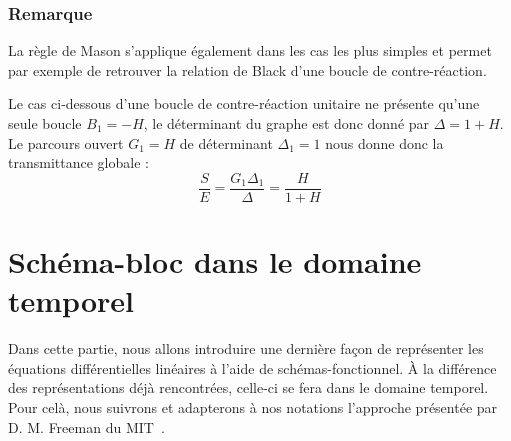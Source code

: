 \subsubsection*{Remarque}
La règle de Mason s'applique également dans les cas les plus simples et permet
par exemple de retrouver la relation de Black d'une boucle de contre-réaction.
\begin{center}
    
\end{center}
Le cas ci-dessous d'une boucle de contre-réaction unitaire ne présente qu'une 
seule boucle $B_1=-H$, le déterminant du graphe est donc donné par $\Delta=1+H$.
Le parcours ouvert $G_1=H$ de déterminant $\Delta_1=1$ nous donne donc la 
transmittance globale :
\[
    \dfrac{S}{E}=\dfrac{G_1\Delta_1}{\Delta}=\dfrac{H}{1+H}
\]
\clearpage
\section{Schéma-bloc dans le domaine temporel}
Dans cette partie, nous allons introduire une dernière façon de représenter
les équations différentielles linéaires à l'aide de schémas-fonctionnel.
À la différence des représentations déjà rencontrées, celle-ci se fera dans 
le domaine temporel. Pour celà, nous suivrons et adapterons à nos notations
l'approche présentée par D. M. Freeman du MIT~\cite{Freeman}.
